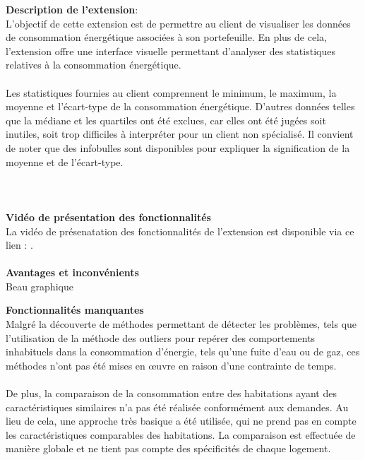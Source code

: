 \documentclass[../rapport.tex]{subfiles}
\begin{document}
\textbf{Description de l'extension}: \\
L'objectif de cette extension est de permettre au client de visualiser les données de consommation énergétique associées à son portefeuille. En plus de cela, l'extension offre une interface visuelle permettant d'analyser des statistiques relatives à la consommation énergétique. \\ \\
Les statistiques fournies au client comprennent le minimum, le maximum, la moyenne et l'écart-type de la consommation énergétique. D'autres données telles que la médiane et les quartiles ont été exclues, car elles ont été jugées soit inutiles, soit trop difficiles à interpréter pour un client non spécialisé. Il convient de noter que des infobulles sont disponibles pour expliquer la signification de la moyenne et de l'écart-type. \\ \\
\\ \\
\textbf{Vidéo de présentation des fonctionnalités} \\
La vidéo de présenatation des fonctionnalités de l'extension est disponible via ce lien : . \\ \\

\textbf{Avantages et inconvénients} \\
Beau graphique

\textbf{Fonctionnalités manquantes} \\
Malgré la découverte de méthodes permettant de détecter les problèmes, tels que l'utilisation de la méthode des outliers pour repérer des comportements inhabituels dans la consommation d'énergie, tels qu'une fuite d'eau ou de gaz, ces méthodes n'ont pas été mises en œuvre en raison d'une contrainte de temps. \\ \\
De plus, la comparaison de la consommation entre des habitations ayant des caractéristiques similaires n'a pas été réalisée conformément aux demandes. Au lieu de cela, une approche très basique a été utilisée, qui ne prend pas en compte les caractéristiques comparables des habitations. La comparaison est effectuée de manière globale et ne tient pas compte des spécificités de chaque logement.
\end{document}
